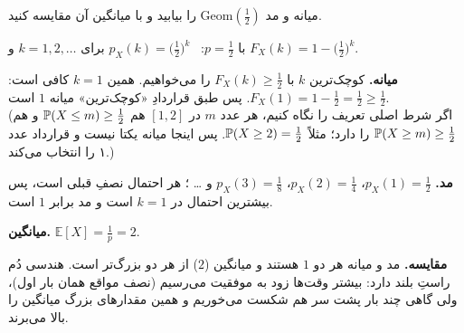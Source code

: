 \begin{exercise}
  میانه و مد $\mathrm{Geom}(\tfrac12)$ را بیابید و با میانگین آن مقایسه کنید.
  \begin{solution}
    با $p=\frac12$: \ $p_X(k)=\bigl(\frac12\bigr)^k$ برای $k=1,2,\dots$ و $F_X(k)=1-\bigl(\frac12\bigr)^k$.

    \textbf{میانه.} کوچک‌ترین $k$ با $F_X(k)\ge\frac12$ را می‌خواهیم. همین $k=1$ کافی است: $F_X(1)=1-\frac12=\frac12\ge\frac12$. پس طبق قراردادِ «کوچک‌ترین» میانه $1$ است.\\
    (اگر شرط اصلی تعریف را نگاه کنیم، هر عدد $m$ در $[1,2]$ هم $\P(X\le m)\ge\frac12$ و هم $\P(X\ge m)\ge\frac12$ را دارد؛ مثلاً $\P(X\ge2)=\frac12$. پس اینجا میانه یکتا نیست و قرارداد عدد ۱ را انتخاب می‌کند.)

    \textbf{مد.} $p_X(1)=\frac12$، $p_X(2)=\frac14$، $p_X(3)=\frac18$ و … ؛ هر احتمال نصفِ قبلی است، پس بیشترین احتمال در $k=1$ است و مد برابر $1$ است.

    \textbf{میانگین.} $\mathbb E[X]=\frac1p=2$.

    \textbf{مقایسه.} مد و میانه هر دو $1$ هستند و میانگین ($2$) از هر دو بزرگ‌تر است. هندسی دُم راستِ بلند دارد: بیشتر وقت‌ها زود به موفقیت می‌رسیم (نصف مواقع همان بار اول)، ولی گاهی چند بار پشت سر هم شکست می‌خوریم و همین مقدارهای بزرگ میانگین را بالا می‌برند.
  \end{solution}
\end{exercise}
